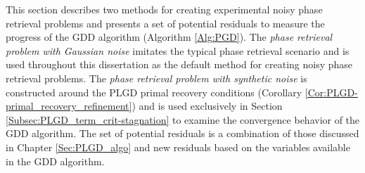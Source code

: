This section describes two methods for creating experimental noisy phase retrieval problems and presents a set of potential residuals to measure the progress of the GDD algorithm (Algorithm \ref{Alg:PGD}).
The \textit{phase retrieval problem with Gaussian noise} imitates the typical phase retrieval scenario and is used throughout this dissertation as the default method for creating noisy phase retrieval problems.
The \textit{phase retrieval problem with synthetic noise} is constructed around the PLGD primal recovery conditions (Corollary \ref{Cor:PLGD-primal_recovery_refinement}) and is used exclusively in Section \ref{Subsec:PLGD_term_crit-stagnation} to examine the convergence behavior of the GDD algorithm.
The set of potential residuals is a combination of those discussed in Chapter \ref{Sec:PLGD_algo} and new residuals based on the variables available in the GDD algorithm. 











